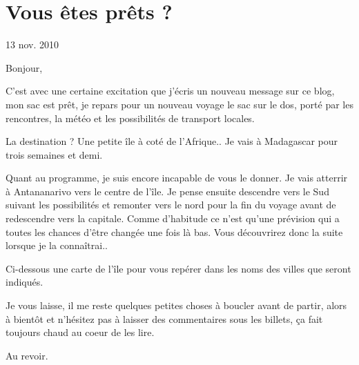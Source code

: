 \section{Vous êtes prêts ?}

13 nov. 2010

\begin{multicols}{2}

Bonjour,

C'est avec une certaine excitation que j'écris un nouveau message sur ce blog, mon sac est prêt, je repars pour un nouveau voyage le sac sur le dos, porté par les rencontres, la météo et les possibilités de transport locales.

La destination ? Une petite île à coté de l'Afrique.. Je vais à Madagascar pour trois semaines et demi.

Quant au programme, je suis encore incapable de vous le donner. Je vais atterrir à Antananarivo vers le centre de l'île. Je pense ensuite descendre vers le Sud suivant les possibilités et remonter vers le nord pour la fin du voyage avant de redescendre vers la capitale. Comme d'habitude ce n'est qu'une prévision qui a toutes les chances d'être changée une fois là bas. Vous découvrirez donc la suite lorsque je la connaîtrai..

Ci-dessous une carte de l'île pour vous repérer dans les noms des villes que seront indiqués.


Je vous laisse, il me reste quelques petites choses à boucler avant de partir, alors à bientôt et n'hésitez pas à laisser des commentaires sous les billets, ça fait toujours chaud au coeur de les lire.

Au revoir.

\end{multicols}


